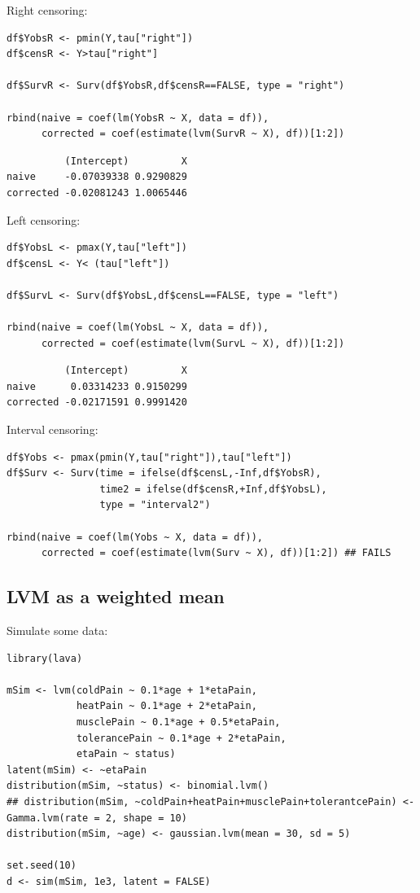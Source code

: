 \documentclass{article}
\begin{document}
Right censoring:
\lstset{language=r,label= ,caption= ,captionpos=b,numbers=none}
\begin{lstlisting}
df$YobsR <- pmin(Y,tau["right"])
df$censR <- Y>tau["right"]

df$SurvR <- Surv(df$YobsR,df$censR==FALSE, type = "right")

rbind(naive = coef(lm(YobsR ~ X, data = df)),
      corrected = coef(estimate(lvm(SurvR ~ X), df))[1:2])
\end{lstlisting}

\begin{verbatim}
          (Intercept)         X
naive     -0.07039338 0.9290829
corrected -0.02081243 1.0065446
\end{verbatim}


Left censoring:
\lstset{language=r,label= ,caption= ,captionpos=b,numbers=none}
\begin{lstlisting}
df$YobsL <- pmax(Y,tau["left"])
df$censL <- Y< (tau["left"])

df$SurvL <- Surv(df$YobsL,df$censL==FALSE, type = "left")

rbind(naive = coef(lm(YobsL ~ X, data = df)),
      corrected = coef(estimate(lvm(SurvL ~ X), df))[1:2])
\end{lstlisting}

\begin{verbatim}
          (Intercept)         X
naive      0.03314233 0.9150299
corrected -0.02171591 0.9991420
\end{verbatim}


Interval censoring:
\lstset{language=r,label= ,caption= ,captionpos=b,numbers=none}
\begin{lstlisting}
df$Yobs <- pmax(pmin(Y,tau["right"]),tau["left"])
df$Surv <- Surv(time = ifelse(df$censL,-Inf,df$YobsR),
                time2 = ifelse(df$censR,+Inf,df$YobsL),
                type = "interval2")

rbind(naive = coef(lm(Yobs ~ X, data = df)),
      corrected = coef(estimate(lvm(Surv ~ X), df))[1:2]) ## FAILS
\end{lstlisting}

\subsection{LVM as a weighted mean}
\label{sec:org6107d64}
Simulate some data:
\lstset{language=r,label= ,caption= ,captionpos=b,numbers=none}
\begin{lstlisting}
library(lava)

mSim <- lvm(coldPain ~ 0.1*age + 1*etaPain,
            heatPain ~ 0.1*age + 2*etaPain,
            musclePain ~ 0.1*age + 0.5*etaPain,
            tolerancePain ~ 0.1*age + 2*etaPain,
            etaPain ~ status)
latent(mSim) <- ~etaPain
distribution(mSim, ~status) <- binomial.lvm()
## distribution(mSim, ~coldPain+heatPain+musclePain+tolerantcePain) <- Gamma.lvm(rate = 2, shape = 10)
distribution(mSim, ~age) <- gaussian.lvm(mean = 30, sd = 5)

set.seed(10)
d <- sim(mSim, 1e3, latent = FALSE)
\end{lstlisting}
\end{document}
